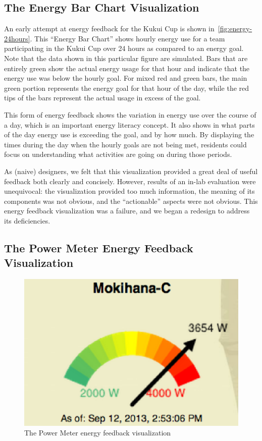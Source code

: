 \documentclass[10pt, conference, compsocconf]{IEEEtran-old}
\begin{document}
\subsection{The Energy Bar Chart Visualization}


An early attempt at energy feedback for the Kukui Cup is shown in~\autoref{fig:energy-24hours}. This ``Energy Bar Chart'' shows hourly energy use for a team participating in the Kukui Cup over 24 hours as compared to an energy goal. Note that the data shown in this particular figure are simulated. Bars that are entirely green show the actual energy usage for that hour and indicate that the energy use was below the hourly goal. For mixed red and green bars, the main green portion represents the energy goal for that hour of the day, while the red tips of the bars represent the actual usage in excess of the goal.

This form of energy feedback shows the variation in energy use over the course of a day, which is an important energy literacy concept. It also shows in what parts of the day energy use is exceeding the goal, and by how much. By displaying the times during the day when the hourly goals are not being met, residents could focus on understanding what activities are going on during those periods.

As (naive) designers, we felt that this visualization provided a great deal of useful feedback both clearly and concisely. However, results of an in-lab evaluation were unequivocal: the visualization provided too much information, the meaning of its components was not obvious, and the ``actionable'' aspects were not obvious. This energy feedback visualization was a failure, and we began a redesign to address its deficiencies.

\subsection{The Power Meter Energy Feedback Visualization}

\begin{figure}[!tb]
	\centering
	\includegraphics[width=0.9\columnwidth]{power-meter.eps}
	\caption{The Power Meter energy feedback visualization}
	\label{fig:power-meter}
\end{figure}
\end{document}
